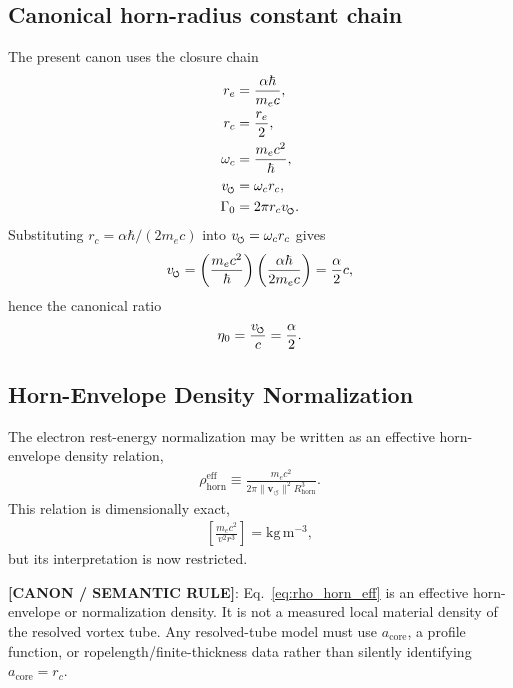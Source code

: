 \documentclass[11pt]{article}
\theoremstyle{definition}
\theoremstyle{plain}
\theoremstyle{remark}
\newcommand{\swirlarrow}{\mathchoice{\mkern-2mu\scriptstyle\boldsymbol{\circlearrowleft}}{\mkern-2mu\scriptstyle\boldsymbol{\circlearrowleft}}{\mkern-2mu\scriptscriptstyle\boldsymbol{\circlearrowleft}}{\mkern-2mu\scriptscriptstyle\boldsymbol{\circlearrowleft}}}
\newcommand{\rc}{{r_c}}
\newcommand{\vnorm}{\lVert \mathbf{v}_{\!\boldsymbol{\circlearrowleft}} \rVert}
\begin{document}
        \subsection{Canonical horn-radius constant chain}
            The present canon uses the closure chain
            \begin{align}
                r_e &= \frac{\alpha \hbar}{m_e c}, \\
                r_c &= \frac{r_e}{2}, \\
                \omega_c &= \frac{m_e c^2}{\hbar}, \\
                v_{\swirlarrow} &= \omega_c r_c, \\
                \Gamma_0 &= 2\pi r_c v_{\swirlarrow}.
            \end{align}
            Substituting $r_c = \alpha\hbar/(2m_e c)$ into $v_{\swirlarrow}=\omega_c r_c$ gives
            \begin{align}
                v_{\swirlarrow}
                =
                \left(\frac{m_e c^2}{\hbar}\right)
                \left(\frac{\alpha \hbar}{2m_e c}\right)
                = \frac{\alpha}{2}c,
            \end{align}
            hence the canonical ratio
            \begin{align}
                \eta_0 = \frac{v_{\swirlarrow}}{c} = \frac{\alpha}{2}.
            \end{align}

        \subsection{Horn-Envelope Density Normalization}
            The electron rest-energy normalization may be written as an effective horn-envelope density relation,
            \begin{align}
                \rho_{\mathrm{horn}}^{\mathrm{eff}}
                \equiv
                \frac{m_e c^2}{2\pi \vnorm^2 R_{\mathrm{horn}}^3}.
                \label{eq:rho_horn_eff}
            \end{align}
            This relation is dimensionally exact,
            \begin{align}
                \left[\frac{m_e c^2}{v^2 r^3}\right]
                =
                \mathrm{kg\,m^{-3}},
            \end{align}
            but its interpretation is now restricted.

            \textbf{[CANON / SEMANTIC RULE]}: Eq.~\eqref{eq:rho_horn_eff} is an effective horn-envelope or normalization density. It is not a measured local material density of the resolved vortex tube. Any resolved-tube model must use $a_{\mathrm{core}}$, a profile function, or ropelength/finite-thickness data rather than silently identifying $a_{\mathrm{core}}=\rc$.
\end{document}
